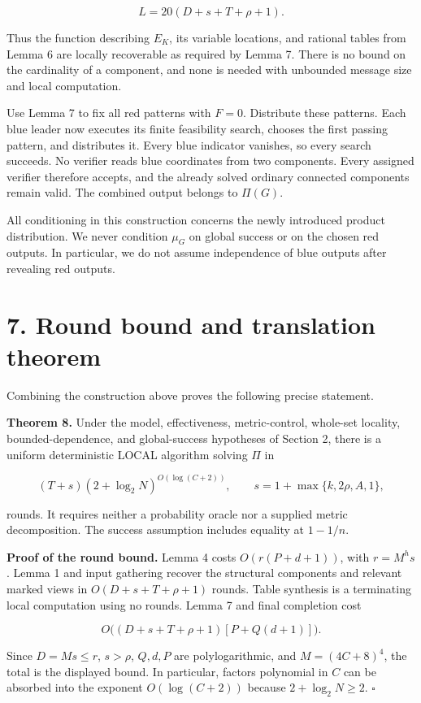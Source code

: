 \documentclass[11pt,a4paper]{article}
\begin{document}
\[ L=20(D+s+T+\rho+1). \]

Thus the function describing \(E_K\), its variable locations, and rational tables from Lemma 6 are locally recoverable as required by Lemma 7.
There is no bound on the cardinality of a component, and none is needed with unbounded message size and local computation.

Use Lemma 7 to fix all red patterns with \(F=0\).
Distribute these patterns.
Each blue leader now executes its finite feasibility search, chooses the first passing pattern, and distributes it.
Every blue indicator vanishes, so every search succeeds.
No verifier reads blue coordinates from two components.
Every assigned verifier therefore accepts, and the already solved ordinary connected components remain valid.
The combined output belongs to \(\Pi(G)\).

All conditioning in this construction concerns the newly introduced product distribution.
We never condition \(\mu_G\) on global success or on the chosen red outputs.
In particular, we do not assume independence of blue outputs after revealing red outputs.

\section{7. Round bound and translation theorem}\label{round-bound-and-translation-theorem}

Combining the construction above proves the following precise statement.

\textbf{Theorem 8.} Under the model, effectiveness, metric-control, whole-set locality, bounded-dependence, and global-success hypotheses of Section 2, there is a uniform deterministic LOCAL algorithm solving \(\Pi\) in

\[ (T+s)(2+\log_2N)^{O(\log(C+2))}, \qquad s=1+\max\{k,2\rho,A,1\}, \]

rounds.
It requires neither a probability oracle nor a supplied metric decomposition.
The success assumption includes equality at \(1-1/n\).

\textbf{Proof of the round bound.} Lemma 4 costs \(O(r(P+d+1))\), with \(r=M^hs\).
Lemma 1 and input gathering recover the structural components and relevant marked views in \(O(D+s+T+\rho+1)\) rounds.
Table synthesis is a terminating local computation using no rounds.
Lemma 7 and final completion cost

\[ O\bigl((D+s+T+\rho+1)[P+Q(d+1)]\bigr). \]

Since \(D=Ms\le r\), \(s>\rho\), \(Q,d,P\) are polylogarithmic, and \(M=(4C+8)^4\), the total is the displayed bound.
In particular, factors polynomial in \(C\) can be absorbed into the exponent \(O(\log(C+2))\) because \(2+\log_2N\ge2\). \(\square\)
\end{document}
